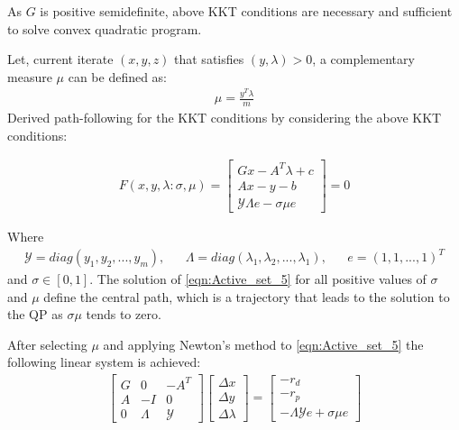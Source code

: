 As $G$ is positive semidefinite, above KKT conditions are necessary and sufficient to solve convex quadratic program.

Let, current iterate $(x,y,z)$ that satisfies $(y,\lambda)>0$, a complementary measure $\mu$ can be defined as:
\begin{equation}
	\begin{aligned}
		\mu = \frac{y^T\lambda}{m}
	\end{aligned}
	\label{eqn:Path_following_4}
\end{equation}
Derived path-following for the KKT conditions by considering the above KKT conditions:

\begin{equation}
\begin{aligned}
F(x,y,\lambda:\sigma,\mu) = 
\begin{bmatrix}
  	Gx-A^T\lambda+c\\
    Ax-y-b\\
    \mathcal{Y} \Lambda e - \sigma \mu e
  \end{bmatrix}
  =0
\end{aligned}
\label{eqn:Path_following_5}
\end{equation}

Where
\begin{equation*}
	\begin{aligned}
		\mathcal{Y} = diag(y_1,y_2,...,y_m), & & \Lambda = diag(\lambda_1 , \lambda_2,...,\lambda_1), & & e = (1,1,...,1)^T
	\end{aligned}
\end{equation*}
and  $\sigma \in [0,1]$. The solution of \ref{eqn:Active_set_5} for all positive values of $\sigma$ and $\mu$ define the central path, which is a trajectory that leads to the solution to the QP as $\sigma \mu$ tends to zero.

After selecting $\mu$ and applying Newton's method to \ref{eqn:Active_set_5} the following linear system is achieved:
\begin{equation}
	\begin{aligned}
		\begin{bmatrix}
			G & 0 & -A^T\\
			A & -I & 0\\
			0 & \Lambda & \mathcal{Y} 
		\end{bmatrix}
		\begin{bmatrix}
			\Delta x\\
			\Delta y\\
			\Delta \lambda
		\end{bmatrix}
		=
		\begin{bmatrix}
			-r_d\\
			-r_p\\
			-\Lambda \mathcal{Y}e + \sigma \mu e
		\end{bmatrix}
	\end{aligned}
	\label{eqn: Path_planning_6}
\end{equation}

